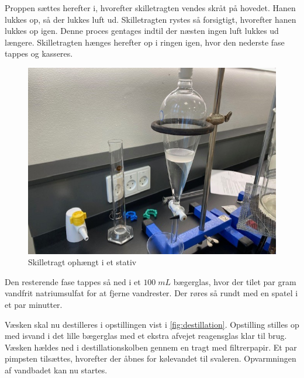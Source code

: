 \documentclass{report}
\begin{document}
Proppen sættes herefter i, hvorefter skilletragten vendes skråt på hovedet.
Hanen lukkes op, så der lukkes luft ud.
Skilletragten rystes så forsigtigt, hvorefter hanen lukkes op igen.
Denne proces gentages indtil der næsten ingen luft lukkes ud længere.
Skilletragten hænges herefter op i ringen igen, hvor den nederste fase tappes og kasseres.
\begin{figure}[H]
\begin{center}
  \includegraphics[scale=0.5]{Skilletragt}
\end{center}
\caption{Skilletragt ophængt i et stativ}
\label{fig:skilletragt}
\end{figure}

Den resterende fase tappes så ned i et $100 \;\unit{mL} $ bægerglas, hvor der tilet par gram vandfrit natriumsulfat for at fjerne vandrester.
Der røres så rundt med en spatel i et par minutter.

Væsken skal nu destilleres i opstillingen vist i \cref{fig:destillation}.
Opstilling stilles op med isvand i det lille bægerglas med et ekstra afvejet reagensglas klar til brug.
Væsken hældes ned i destillationskolben gennem en tragt med filtrerpapir.
Et par pimpsten tilsættes, hvorefter der åbnes for kølevandet til svaleren. 
Opvarmningen af vandbadet kan nu startes.
\end{document}
